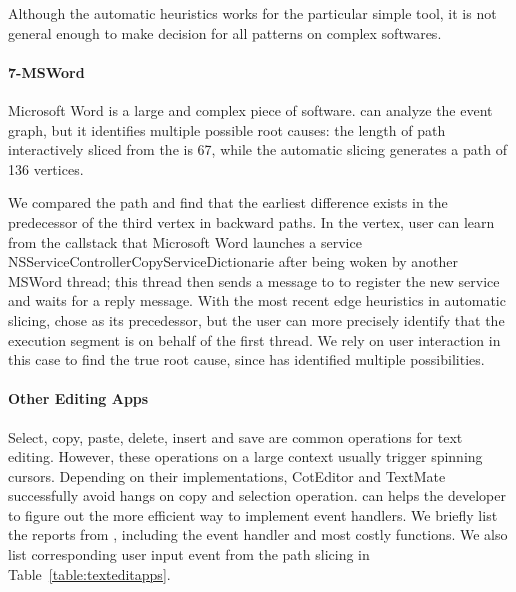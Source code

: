 Although the automatic heuristics works for the particular simple tool, it is
not general enough to make decision for all patterns on complex softwares.

\paragraph{7-MSWord}

Microsoft Word is a large and complex piece of software. \xxx can analyze the
event graph, but it identifies multiple possible root causes: the length of path
interactively sliced from the \spinningnode is 67, while the automatic slicing
generates a path of 136 vertices.


We compared the path and find that the earliest difference exists in
the predecessor of the third vertex in backward paths. In the vertex,
user can learn from the callstack that Microsoft Word launches a service
NSServiceControllerCopyServiceDictionarie after being woken by another MSWord
thread; this thread then sends a message to  to register the new
service and waits for a reply message. With the most recent edge heuristics in
automatic slicing, \xxx chose  as its precedessor, but the user can
more precisely identify that the execution segment is on behalf of the first
thread. We rely on user interaction in this case to find the true root cause,
since \xxx has identified multiple possibilities.

\paragraph{Other Editing Apps}

Select, copy, paste, delete, insert and save are common operations for text
editing. However, these operations on a large context usually trigger spinning
cursors. Depending on their implementations, CotEditor and TextMate successfully
avoid hangs on copy and selection operation. \xxx can helps the developer to
figure out the more efficient way to implement event handlers. We briefly list
the reports from \spinningnode, including the event handler and most costly
functions. We also list corresponding user input event from the path slicing in
Table~\ref{table:texteditapps}.


